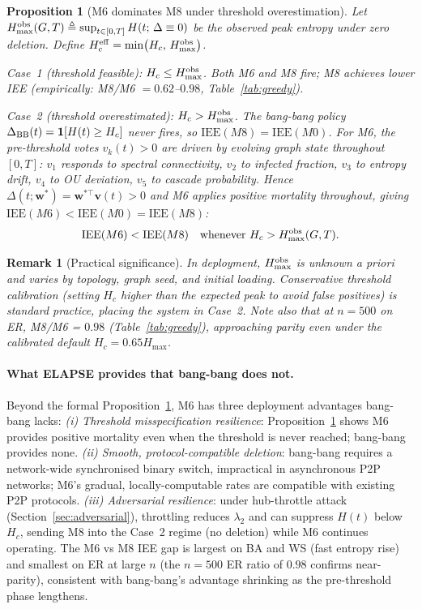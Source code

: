 \documentclass[review,12pt]{elsarticle}
\newcommand{\bfw}{\mathbf{w}}
\newcommand{\bfv}{\mathbf{v}}
\newcommand{\IEE}{\mathrm{IEE}}
\newcommand{\Hc}{H_c}
\newcommand{\Hmax}{H_{\max}}
\newtheorem{proposition}{Proposition}
\newtheorem{remark}{Remark}
\begin{document}
\begin{proposition}[M6 dominates M8 under threshold overestimation]
\label{prop:hc_dominance}
Let $\Hmax^{\rm obs}(G,T) \triangleq \sup_{t \in [0,T]} H(t;\,\Delta \equiv 0)$
be the observed peak entropy under zero deletion.  Define
$\Hc^{\rm eff} = \min\bigl(\Hc,\,\Hmax^{\rm obs}\bigr)$.

\emph{Case~1 (threshold feasible):} $\Hc \leq \Hmax^{\rm obs}$.  Both M6 and
M8 fire; M8 achieves lower IEE (empirically: M8/M6 $= 0.62$--$0.98$,
Table~\ref{tab:greedy}).

\emph{Case~2 (threshold overestimated):} $\Hc > \Hmax^{\rm obs}$.  The
bang-bang policy $\Delta_{\rm BB}(t) = \mathbf{1}[H(t) \geq \Hc]$ never
fires, so $\IEE(M8) = \IEE(M0)$.  For M6, the pre-threshold votes
$v_k(t) > 0$ are driven by evolving graph state throughout $[0,T]$:
$v_1$ responds to spectral connectivity, $v_2$ to infected fraction, $v_3$
to entropy drift, $v_4$ to OU deviation, $v_5$ to cascade probability.
Hence $\Delta(t;\bfw^*) = \bfw^{*\top}\bfv(t) > 0$ and M6 applies positive
mortality throughout, giving $\IEE(M6) < \IEE(M0) = \IEE(M8)$:
\[
  \IEE(M6) < \IEE(M8) \quad \text{whenever } \Hc > \Hmax^{\rm obs}(G,T).
\]
\end{proposition}

\begin{remark}[Practical significance]
In deployment, $\Hmax^{\rm obs}$ is unknown a priori and varies by topology,
graph seed, and initial loading.  Conservative threshold calibration
(setting $\Hc$ higher than the expected peak to avoid false positives) is
standard practice, placing the system in Case~2.  Note also that at $n=500$
on ER, M8/M6 = $0.98$ (Table~\ref{tab:greedy}), approaching parity even
under the calibrated default $\Hc = 0.65\Hmax$.
\end{remark}

\paragraph{What ELAPSE provides that bang-bang does not.}
Beyond the formal Proposition~\ref{prop:hc_dominance}, M6 has three
deployment advantages bang-bang lacks:
\emph{(i) Threshold misspecification resilience}: Proposition~\ref{prop:hc_dominance}
shows M6 provides positive mortality even when the threshold is never reached;
bang-bang provides none.
\emph{(ii) Smooth, protocol-compatible deletion}: bang-bang requires a
network-wide synchronised binary switch, impractical in asynchronous P2P
networks; M6's gradual, locally-computable rates are compatible with
existing P2P protocols.
\emph{(iii) Adversarial resilience}: under hub-throttle attack (Section~\ref{sec:adversarial}),
throttling reduces $\lambda_2$ and can suppress $H(t)$ below $\Hc$,
sending M8 into the Case~2 regime (no deletion) while M6 continues operating.
The M6 vs M8 IEE gap is largest on BA and WS (fast entropy rise) and
smallest on ER at large $n$ (the $n=500$ ER ratio of $0.98$ confirms
near-parity), consistent with bang-bang's advantage shrinking as the
pre-threshold phase lengthens.
\end{document}
